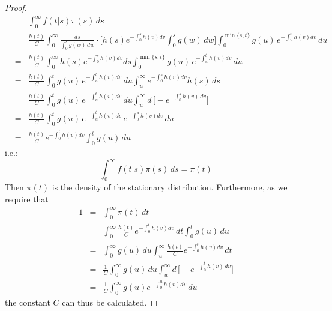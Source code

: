 \documentclass[pdftex,10pt]{article}
\begin{document}
\begin{proof}
\begin{eqnarray*}
&&\int_0^{\infty}f(t|s)\pi(s)\,ds\\
&=&\frac{h(t)}{C}\int_0^{\infty}\frac{ds}{\int_0^sg(w)\,dw}\cdot
\Bigg[h(s)e^{-\int_0^sh(v)dv}\int_0^sg(w)\,dw\bigg]
\int_0^{\min\{s,t\}}g(u)\,e^{-\int_u^th(v)dv}\,du\\
&=&\frac{h(t)}{C}\int_0^{\infty}h(s)e^{-\int_0^sh(v)dv}ds
\int_0^{\min\{s,t\}}g(u)\,e^{-\int_u^th(v)dv}\,du\\
&=&\frac{h(t)}{C}\int_0^tg(u)\,e^{-\int_u^th(v)dv}\,du
\int_u^{\infty}e^{-\int_0^sh(v)dv}h(s)\,ds\\
&=&\frac{h(t)}{C}\int_0^tg(u)\,e^{-\int_u^th(v)dv}\,du\int_u^{\infty}
d\,\Big[-e^{-\int_0^sh(v)\,dv}\Big]\\
&=&\frac{h(t)}{C}\int_0^tg(u)\,e^{-\int_u^th(v)dv}\,e^{-\int_0^uh(v)dv}\,du\\
&=&\frac{h(t)}{C}e^{-\int_0^th(v)dv}\int_0^tg(u)\,du
\end{eqnarray*}
i.e.:
$$\int_0^{\infty}f(t|s)\pi(s)\,ds=\pi(t)$$
Then $\pi(t)$ is the density of the stationary distribution. Furthermore, as we require that
\begin{eqnarray*}
1&=&\int_0^{\infty}\pi(t)\,dt\\
&=&\int_0^{\infty}\frac{h(t)}{C}e^{-\int_0^th(v)dv}\,dt\int_0^tg(u)\,du\\
&=&\int_0^{\infty}g(u)\,du\int_u^{\infty}\frac{h(t)}{C}e^{-\int_0^th(v)dv}\,dt\\
&=&\frac{1}{C}\int_0^{\infty}g(u)\,du\int_u^{\infty}d\,
\Big[-e^{-\int_0^th(v)\,dv}\Big]\\
&=&\frac{1}{C}\int_0^{\infty}g(u)e^{-\int_0^uh(v)dv}\,du
\end{eqnarray*}
the constant $C$ can thus be calculated.
\end{proof}
\end{document}
